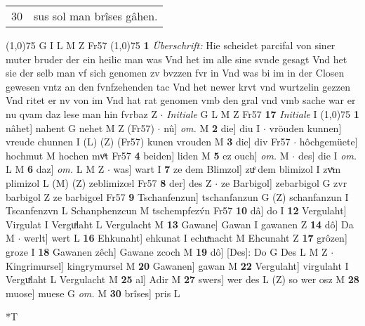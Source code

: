 \documentclass[8pt,a4paper,notitlepage]{article}
\begin{document}
\begin{table}[ht]
\begin{minipage}[t]{0.5\linewidth}
\begin{tabular}{rl}
30 & sus sol man brîses gâhen.\\ 
\end{tabular}
\scriptsize
\line(1,0){75} \newline
G I L M Z Fr57 \newline
\line(1,0){75} \newline
\textbf{1} \textit{Überschrift:} Hie scheidet parcifal von siner muter bruder der ein heilic man was Vnd het im alle sine svnde gesagt Vnd het sie der selb man vf sich genomen zv bvzzen fvr in Vnd was bi im in der Closen gewesen vntz an den fvnfzehenden tac Vnd het newer krvt vnd wurtzelin gezzen Vnd ritet er nv von im Vnd hat rat genomen vmb den gral vnd vmb sache war er nu qvam daz lese man hin fvrbaz Z   $\cdot$ \textit{Initiale} G L M Z Fr57  \textbf{17} \textit{Initiale} I  \newline
\line(1,0){75} \newline
\textbf{1} nâhet] nahent G nehet M Z (Fr57)  $\cdot$ nû] \textit{om.} M \textbf{2} die] diu I  $\cdot$ vröuden kunnen] vreude chunnen I (L) (Z) (Fr57) kunen vrouden M \textbf{3} die] div Fr57  $\cdot$ hôchgemüete] hochmut M hochen mvͦt Fr57 \textbf{4} beiden] liden M \textbf{5} ez ouch] \textit{om.} M  $\cdot$ des] die I \textit{om.} L M \textbf{6} daz] \textit{om.} L M Z  $\cdot$ was] wart I \textbf{7} ze dem Blimzol] zuͤ dem blimizol I zvͯm plimizol L (M) (Z) zeblimizœl Fr57 \textbf{8} der] des Z  $\cdot$ ze Barbigol] zebarbigol G zvr barbigol Z ze barbigœl Fr57 \textbf{9} Tschanfenzun] tschanfanzun G (Z) schanfanzun I Tscanfenzvn L Schanphenzcun M tschempfezv́n Fr57 \textbf{10} dâ] do I \textbf{12} Vergulaht] Virgulat I Verguͯlaht L Vergulacht M \textbf{13} Gawane] Gawan I gawanen Z \textbf{14} dô] Da M  $\cdot$ werlt] wert L \textbf{16} Ehkunaht] ehkunat I echuͯnacht M Ehcunaht Z \textbf{17} grôzen] groze I \textbf{18} Gawanen zêch] Gawane zcoch M \textbf{19} dô] [Des]: Do G Des L M Z  $\cdot$ Kingrimursel] kingrymursel M \textbf{20} Gawanen] gawan M \textbf{22} Vergulaht] virgulaht I Verguͯlaht L Vergulacht M \textbf{25} al] Adir M \textbf{27} swers] wer des L (Z) so wer osz M \textbf{28} muose] muese G \textit{om.} M \textbf{30} brîses] pris L \newline
\end{minipage}
\hspace{0.5cm}
\begin{minipage}[t]{0.5\linewidth}
\small
\begin{center}*T
\end{center}
\begin{tabular}{rl}

\end{tabular}
\end{minipage}
\end{table}
\end{document}
